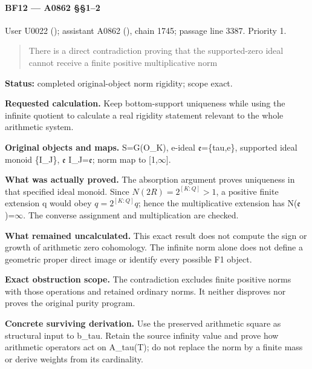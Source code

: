 \paragraph{BF12 --- A0862 §§1--2}\label{bf12-a0862-12}

User U0022 (\protect{});
assistant A0862 (\protect{}),
chain 1745; passage line 3387. Priority 1.

\begin{quote}
There is a direct contradiction proving that the supported-zero ideal
cannot receive a finite positive multiplicative norm
\end{quote}

\textbf{Status:} completed original-object norm rigidity; scope exact.

\textbf{Requested calculation.} Keep bottom-support uniqueness while
using the infinite quotient to calculate a real rigidity statement
relevant to the whole arithmetic system.

\textbf{Original objects and maps.} S=G(O\_K), e-ideal
\allowbreak{}\ensuremath{𝔢}\allowbreak{}=\{tau,e\}, supported ideal
monoid \{I\_J\}, \allowbreak{}\ensuremath{𝔢}\allowbreak{}
I\_J=\allowbreak{}\ensuremath{𝔢}\allowbreak{}; norm map to
[1,\allowbreak{}\ensuremath{∞}\allowbreak{}].

\textbf{What was actually proved.} The absorption argument proves
uniqueness in that specified ideal monoid. Since \(N(2R)=2^{[K:Q]}>1\),
a positive finite extension q would obey \(q=2^{[K:Q]}q\); hence the
multiplicative extension has
N(\allowbreak{}\ensuremath{𝔢}\allowbreak{})=\allowbreak{}\ensuremath{∞}\allowbreak{}.
The converse assignment and multiplication are checked.

\textbf{What remained uncalculated.} This exact result does not compute
the sign or growth of arithmetic zero cohomology. The infinite norm
alone does not define a geometric proper direct image or identify every
possible F1 object.

\textbf{Exact obstruction scope.} The contradiction excludes finite
positive norms with those operations and retained ordinary norms. It
neither disproves nor proves the original purity program.

\textbf{Concrete surviving derivation.} Use the preserved arithmetic
square as structural input to b\_tau. Retain the source infinity value
and prove how arithmetic operators act on A\_tau(T); do not replace the
norm by a finite mass or derive weights from its cardinality.


